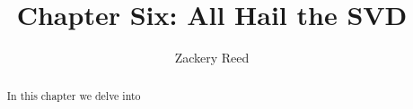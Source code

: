 \documentclass{xourse}
\title{Chapter Six: All Hail the SVD}
\author{Zackery Reed}
\begin{document}
\begin{abstract}
    In this chapter we delve into 
\end{abstract}
\maketitle

\sectionstyle
\end{document}
